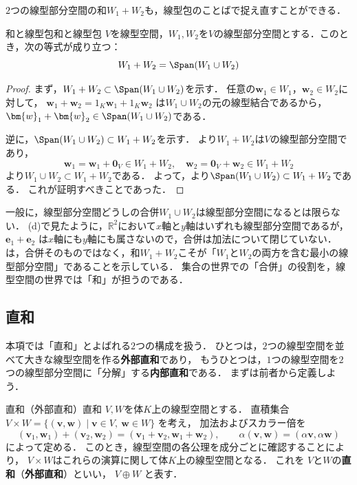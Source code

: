 $2$つの線型部分空間の和$W_1+W_2$も，線型包のことばで捉え直すことができる．

\begin{prop}{和と線型包}{和と線型包}
  $V$を線型空間，$W_1, W_2$を$V$の線型部分空間とする．このとき，次の等式が成り立つ：
  \[
    W_1 + W_2 = \Span(W_1 \cup W_2)
  \]
\end{prop}

\begin{tleftbar}
\begin{proof}
  まず，$W_1 + W_2 \subset \Span(W_1 \cup W_2)$を示す．
  任意の$\bm{w}_1 \in W_1$，$\bm{w}_2 \in W_2$に対して，
  $\bm{w}_1 + \bm{w}_2 = 1_K \bm{w}_1 + 1_K \bm{w}_2$
  は$W_1 \cup W_2$の元の線型結合であるから，$\bm{w}_1 + \bm{w}_2 \in \Span(W_1 \cup W_2)$である．

  逆に，$\Span(W_1 \cup W_2) \subset W_1 + W_2$を示す．
  より$W_1 + W_2$は$V$の線型部分空間であり，
  \[
    \bm{w}_1 = \bm{w}_1 + \bm{0}_V \in W_1 + W_2,
    \quad
    \bm{w}_2 = \bm{0}_V + \bm{w}_2 \in W_1 + W_2
  \]
  より$W_1 \cup W_2 \subset W_1 + W_2$である．
  よって，より$\Span(W_1 \cup W_2) \subset W_1 + W_2$である．
  これが証明すべきことであった．
\end{proof}
\end{tleftbar}

\begin{remark}[合併は線型部分空間とは限らない]
一般に，線型部分空間どうしの合併$W_1 \cup W_2$は線型部分空間になるとは限らない．
(d)で見たように，$\mathbb{R}^2$において$x$軸と$y$軸はいずれも線型部分空間であるが，
$\bm{e}_1 + \bm{e}_2$
は$x$軸にも$y$軸にも属さないので，合併は加法について閉じていない．
は，合併そのものではなく，和$W_1 + W_2$こそが「$W_1$と$W_2$の両方を含む最小の線型部分空間」であることを示している．
集合の世界での「合併」の役割を，線型空間の世界では「和」が担うのである．
\end{remark}

\subsection{直和}

本項では「直和」とよばれる$2$つの構成を扱う．
ひとつは，$2$つの線型空間を並べて大きな線型空間を作る\textbf{外部直和}であり，
もうひとつは，$1$つの線型空間を$2$つの線型部分空間に「分解」する\textbf{内部直和}である．
まずは前者から定義しよう．

\begin{definition}{直和（外部直和）}{直和}
  $V,W$を体$K$上の線型空間とする．
  直積集合
  $V\times W
  =
  \{
  (\bm{v},\bm{w})
  \mid
  \bm{v}\in V,\
  \bm{w}\in W
  \}$
  を考え，
  加法およびスカラー倍を
  \[
  (\bm{v}_1,\bm{w}_1)+(\bm{v}_2,\bm{w}_2)
  =
  (\bm{v}_1+\bm{v}_2,\bm{w}_1+\bm{w}_2),
  \qquad
  \alpha(\bm{v},\bm{w})
  =
  (\alpha \bm{v},\alpha \bm{w})
  \]
  によって定める．
  このとき，線型空間の各公理を成分ごとに確認することにより，
  $V\times W$はこれらの演算に関して体$K$上の線型空間となる．
  これを
  $V$と$W$の\textbf{直和}（\textbf{外部直和}）といい，
  $V\oplus W$
  と表す．
\end{definition}

